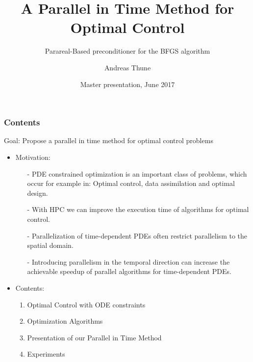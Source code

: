 \documentclass[9pt]{beamer}
\title{A Parallel in Time Method for Optimal Control}
\subtitle{Parareal-Based preconditioner for the BFGS algorithm}
\author{Andreas Thune}
\institute[UiO]{Faculty of Mathematics \\University of Oslo,\\Simula Research Laboratory}
\date{Master presentation, June 2017}
\begin{document}
 
\frame{\titlepage}
\begin{frame}
\frametitle{Contents}
\begin{block}{}
\centering
\alert{Goal}: Propose a parallel in time method for optimal control problems
\end{block}
\begin{itemize}
\item{Motivation:
\begin{itemize}
\item[-]{PDE constrained optimization is an important class of problems, which occur for example in: Optimal control, data assimilation and optimal design.}
\item[-]{With HPC we can improve the execution time of algorithms for optimal control.}
\item[-]{Parallelization of time-dependent PDEs often restrict parallelism to the spatial domain.}
\item[-]{Introducing parallelism in the temporal direction can increase the achievable speedup of parallel algorithms for time-dependent PDEs. }
\end{itemize}}
\item{Contents:
\begin{enumerate}[I]
\item{Optimal Control with ODE constraints}
\item{Optimization Algorithms}
\item{Presentation of our Parallel in Time Method}
\item{Experiments}
\end{enumerate}}
\end{itemize}
\end{frame}
\end{document}
